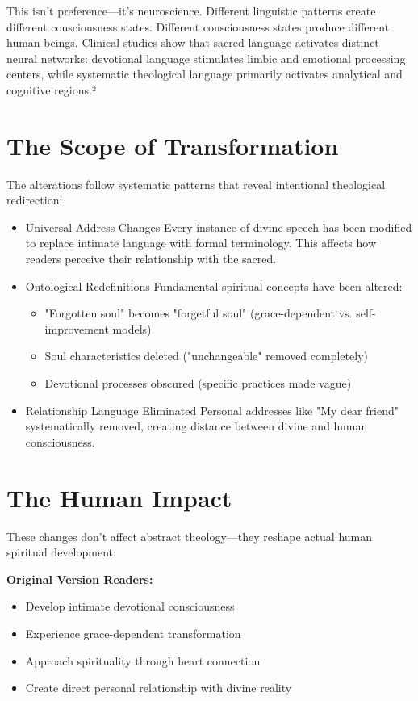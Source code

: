 \documentclass[11pt,twoside]{book}
\begin{document}
This isn't preference—it's neuroscience. Different linguistic patterns create different consciousness states. Different consciousness states produce different human beings. Clinical studies show that sacred language activates distinct neural networks: devotional language stimulates limbic and emotional processing centers, while systematic theological language primarily activates analytical and cognitive regions.²
\section*{The Scope of Transformation}
\label{sec:orga572d82}

The alterations follow systematic patterns that reveal intentional theological redirection:
\begin{itemize}
\item Universal Address Changes
\label{sec:org31bc1ae}
Every instance of divine speech has been modified to replace intimate language with formal terminology. This affects how readers perceive their relationship with the sacred.
\item Ontological Redefinitions
\label{sec:org7a91957}
Fundamental spiritual concepts have been altered:
\begin{itemize}
\item "Forgotten soul" becomes "forgetful soul" (grace-dependent vs. self-improvement models)
\item Soul characteristics deleted ("unchangeable" removed completely)
\item Devotional processes obscured (specific practices made vague)
\end{itemize}
\item Relationship Language Eliminated
\label{sec:org66b481a}
Personal addresses like "My dear friend" systematically removed, creating distance between divine and human consciousness.

\sectionbreak
\end{itemize}
\section*{The Human Impact}
\label{sec:org34d7611}

These changes don't affect abstract theology—they reshape actual human spiritual development:

\textbf{\textbf{Original Version Readers:}}
\begin{itemize}
\item Develop intimate devotional consciousness
\item Experience grace-dependent transformation
\item Approach spirituality through heart connection
\item Create direct personal relationship with divine reality
\end{itemize}
\end{document}
